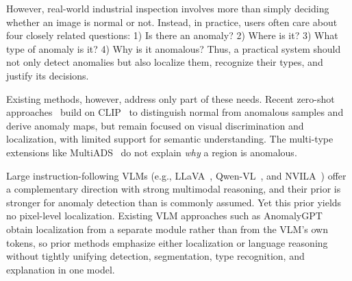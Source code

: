 However, real-world industrial inspection involves more than simply deciding whether an image is normal or not. Instead, in practice, users often care about four closely related questions: 1) Is there an anomaly? 2) Where is it? 3) What type of anomaly is it? 4) Why is it anomalous? Thus, a practical system should not only detect anomalies but also localize them, recognize their types, and justify its decisions.

Existing methods, however, address only part of these needs. Recent zero-shot approaches~\cite{zhou2024anomalyclip, chen2023zero, Cao_2024, nazer2025dapo, salehi2026crane, zhou2026tokenclip, sadikaj2025multiadsdefectawaresupervisionmultitype} build on CLIP~\cite{radford2021} to distinguish normal from anomalous samples and derive anomaly maps, but remain focused on visual discrimination and localization, with limited support for semantic understanding. The multi-type extensions like MultiADS~\cite{sadikaj2025multiadsdefectawaresupervisionmultitype} do not explain \emph{why} a region is anomalous.

Large instruction-following VLMs (e.g., LLaVA~\cite{liu2023visualinstructiontuning}, Qwen-VL~\cite{bai2023qwenvlversatilevisionlanguagemodel}, and NVILA~\cite{liu2025nvilaefficientfrontiervisual}) offer a complementary direction with strong multimodal reasoning, and their prior is stronger for anomaly detection than is commonly assumed. Yet this prior yields no pixel-level localization. Existing VLM approaches such as AnomalyGPT~\cite{gu2023anomalygptdetectingindustrialanomalies} obtain localization from a separate module rather than from the VLM's own tokens, so prior methods emphasize either localization or language reasoning without tightly unifying detection, segmentation, type recognition, and explanation in one model.


